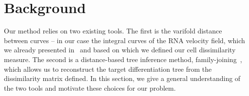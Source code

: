 \documentclass[pdflatex,sn-mathphys-num]{sn-jnl}%
\theoremstyle{thmstyleone}%
\theoremstyle{thmstyletwo}%
\theoremstyle{thmstylethree}%
\begin{document}
\section{Background} \label{sec:background}

Our method relies on two existing tools. The first is the varifold distance~\cite{kaltenmark_general_2017} between curves -- in our case the integral curves of the RNA velocity field, which we already presented in~\cite{maignant_tree_2025} and based on which we defined our cell dissimilarity measure. The second is a distance-based tree inference method, family-joining~\cite{kalaghatgi_family_2016}, which allows us to reconstruct the target differentiation tree from the dissimilarity matrix defined. In this section, we give a general understanding of the two tools and motivate these choices for our problem.
    
\end{document}
